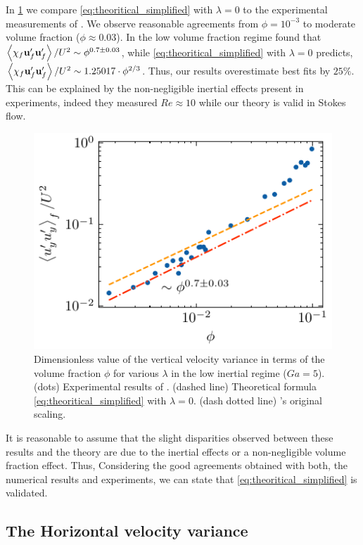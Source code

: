 In \ref{fig:uuyy2}  we compare \ref{eq:theoritical_simplified} with $\lambda = 0$ to the  experimental measurements of \citet{cartellier2009induced}. 
We observe reasonable agreements from $\phi = 10^{-3}$ to moderate volume fraction ($\phi \approx 0.03$). 
In the low volume fraction regime \citet{cartellier2009induced} found that $\left<\chi_f\textbf{u}_f'\textbf{u}_f'\right> / U^2 \sim \phi^{0.7 \pm 0.03}$,  while \ref{eq:theoritical_simplified} with $\lambda = 0$ predicts, $\left<\chi_f\textbf{u}_f'\textbf{u}_f'\right> / U^2 \sim 1.25017 \cdot \phi^{2/3} $. 
Thus, our results overestimate \citet{cartellier2009induced} best fits by $25\%$. 
This can be explained by the non-negligible inertial effects present in \citet{cartellier2009induced} experiments, indeed they measured $Re \approx 10$ while our theory is valid in Stokes flow. 
\begin{figure}
    \centering
    \includegraphics[height = 0.25\textwidth]{image/HOMOGENEOUS_final/CA/cartellier.pdf}
    \caption{Dimensionless value of the vertical velocity variance  in terms of the volume fraction $\phi$ for various $\lambda$ in the low inertial regime ($Ga = 5$). 
    (dots) Experimental  results  of \citet{cartellier2009induced}.
    (dashed line) Theoretical formula \ref{eq:theoritical_simplified} with $\lambda = 0$.
    (dash dotted line) \citet{cartellier2009induced}'s original scaling. 
    }
    \label{fig:uuyy2}
\end{figure}

It is reasonable to assume that the slight disparities observed between these results and the theory are due to the inertial effects or a non-negligible volume fraction effect. 
Thus, Considering the good agreements obtained with both, the numerical results and \citet{cartellier2009induced} experiments, we can state that \ref{eq:theoritical_simplified} is validated. 

\subsection{The Horizontal velocity variance}

